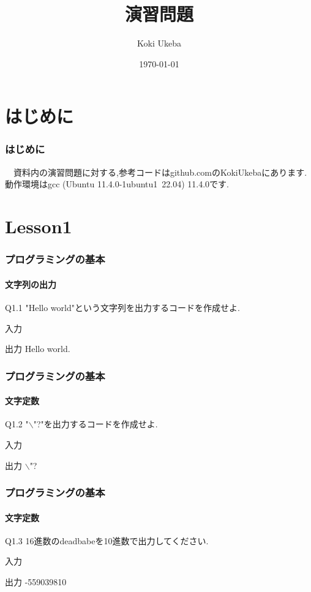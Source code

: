\documentclass[dvipdfmx]{beamer}
\title{演習問題}
\author{Koki Ukeba}
\date{\today}
\begin{document}
\maketitle

\section{はじめに}
\begin{frame}
	\frametitle{はじめに}
	　資料内の演習問題に対する,参考コードはgithub.comのKokiUkebaにあります.動作環境はgcc (Ubuntu 11.4.0-1ubuntu1~22.04) 11.4.0です.
\end{frame}

\begin{frame}[allowframebreaks]
    \tableofcontents
\end{frame}

\section{Lesson1}
\begin{frame}
	\frametitle{プログラミングの基本}
    \framesubtitle{文字列の出力}
	\begin{itembox}[l]{Q1.1}
		"Hello world"という文字列を出力するコードを作成せよ.
	\end{itembox}
	\begin{block}{入力}
	\end{block}
	\begin{block}{出力}
		Hello world.
	\end{block}
\end{frame}

\begin{frame}
    \frametitle{プログラミングの基本}
    \framesubtitle{文字定数}
	\begin{itembox}[l]{Q1.2}
		"$\backslash$"?"を出力するコードを作成せよ.
	\end{itembox}
	\begin{block}{入力}
	\end{block}
	\begin{block}{出力}
        $\backslash$"?
	\end{block}
\end{frame}

\begin{frame}
    \frametitle{プログラミングの基本}
    \framesubtitle{文字定数}
	\begin{itembox}[l]{Q1.3}
        16進数のdeadbabeを10進数で出力してください.
	\end{itembox}
	\begin{block}{入力}
	\end{block}
	\begin{block}{出力}
        -559039810
	\end{block}
\end{frame}
\end{document}
